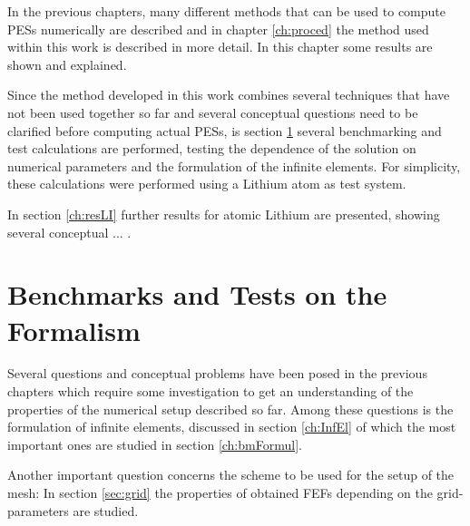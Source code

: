 In the previous chapters, many different methods that can be used to compute PESs numerically are described and in chapter \ref{ch:proced} the method used within this work is described in more detail.
In this chapter some results are shown and explained.

Since the method developed in this work combines several techniques that have not been used together so far and several conceptual questions need to be clarified before computing actual PESs, is section \ref{ch:resBench} several benchmarking and test calculations are performed, testing the dependence of the solution on numerical parameters and the formulation of the infinite elements. 
For simplicity, these calculations were performed using a Lithium atom as test system.

In section \ref{ch:resLI} further results for atomic Lithium are presented, showing several conceptual ... .


\section{Benchmarks and Tests on the Formalism}
\label{ch:resBench}
Several questions and conceptual problems have been posed in the previous chapters which require some investigation to get an understanding of the properties of the numerical setup described so far.
Among these questions is the formulation of infinite elements, discussed in section \ref{ch:InfEl} of which the most important ones are studied in section \ref{ch:bmFormul}.

Another important question concerns the scheme to be used for the setup of the mesh: In section \ref{sec:grid} the properties of obtained FEFs depending on the grid-parameters are studied.


